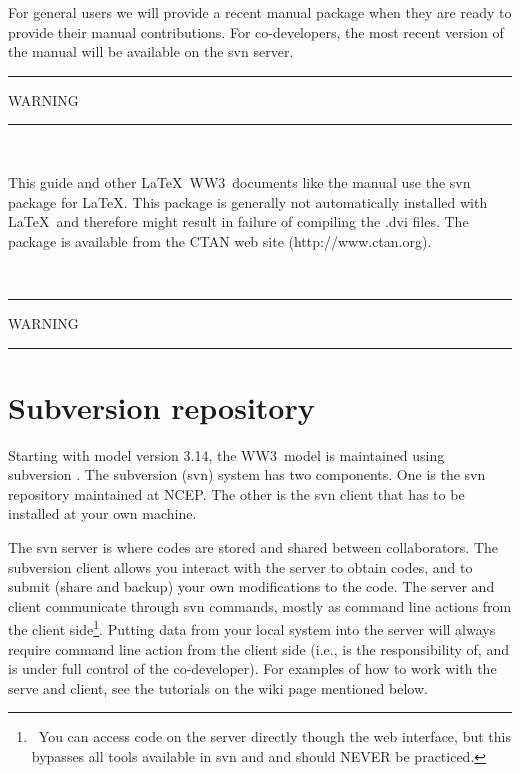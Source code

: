 \documentclass[12pt]{article}
\newcommand{\ws}{WW3}
\newcommand{\file}{\sf}
\newcommand{\pb}{\strut \vfill \pagebreak}
\newcommand{\bpage}{\vfill \pagebreak \strut

\vspace{2.5in} \centerline{This page is intentionally left blank.}}
\newcommand{\newsec}{\setcounter{equation}{0}
                      \setcounter{myfigno}{0}
                      \setcounter{mytabno}{0}}
\newcounter{myfigno}[section]
\newcounter{mytabno}[section]
\begin{document}
\noindent
For general users we will provide a recent manual package when they are ready
to provide their manual contributions. For co-developers, the most recent
version of the manual will be available on the svn server.

\vspace{\baselineskip}
\begin{center}
\rule[1mm]{55mm}{1.0mm} WARNING \rule[1mm]{55mm}{1.0mm} \\ 
\vspace{\baselineskip}
\parbox{120mm}{This guide and other \LaTeX\ \ws\ documents like the manual use
the svn package for \LaTeX. This package is generally not automatically
installed with \LaTeX\ and therefore might result in failure of compiling the
{\file .dvi} files. The package is available from the CTAN web site
(http://www.ctan.org).} \\ \vspace{\baselineskip} \rule[1mm]{55mm}{1.0mm}
WARNING \rule[1mm]{55mm}{1.0mm}
\end{center}


\pb
\section{Subversion repository} \label{sec:svn}
\newsec

Starting with model version 3.14, the \ws\ model is maintained using
subversion \citep{bk:CSea06}. The subversion (svn) system has two
components. One is the svn repository maintained at NCEP. The other is the svn
client that has to be installed at your own machine.

The svn server is where codes are stored and shared between collaborators. The
subversion client allows you interact with the server to obtain codes, and to
submit (share and backup) your own modifications to the code. The server and
client communicate through svn commands, mostly as command line actions from
the client side\footnote{~You can access code on the server directly though
the web interface, but this bypasses all tools available in svn and and should
NEVER be practiced.}. Putting data from your local system into the server will
always require command line action from the client side (i.e., is the
responsibility of, and is under full control of the co-developer). For
examples of how to work with the serve and client, see the tutorials on the
wiki page mentioned below.
\end{document}
